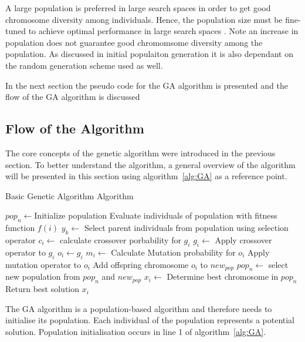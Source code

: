 A large population is preferred in large search spaces in order to get good chromosome diversity among individuals. Hence, the population size must be fine-tuned to achieve optimal performance in large search spaces \cite{AdaptiveSAGA,CompuIntelligenceIntro}. Note an increase in population does not guarantee good chromomsome diversity among the population. As discussed in initial populaiton generation it is also dependant on the random generation scheme used as well. 


In the next section the pseudo code for the \gls{GA} algorithm is presented and the flow of the \gls{GA} algorithm is discussed
\subsection{Flow of the Algorithm}
The core concepts of the genetic algorithm were introduced in the previous section. To better understand the algorithm, a general overview of the algorithm will be presented in this section using algorithm~\ref{alg:GA} as a reference point.
\begin{algorithm}[H]
\caption{Basic Genetic Algorithm Algorithm\cite{FamilyGA,AdaptiveSAGA,DistributedHierarchicalGA,SelfAdaptiveGA}}
\label{alg:GA}
	\begin{algorithmic}[1]
		\State $pop_n\leftarrow$Initialize population
		\State Evaluate individuals of population with fitness function $f(i)$
		\State $y_k \leftarrow$ Select parent individuals from population using selection operator
		\Repeat
				\State $c_i \leftarrow$ calculate crossover porbability for $g_i$
					\State $g_i \leftarrow$ Apply crossover operator to $g_i$
				\EndIf
				\State $o_i \leftarrow g_i$
				\State $m_i\leftarrow$ Calculate Mutation probability for $o_i$
					\State Apply mutation operator to $o_i$
				\EndIf
				\State Add offspring chromosome $o_i$ to $new_{pop}$
			\EndFor
		\State $pop_n \leftarrow$ select new population from $pop_n$ and $new_{pop}$
		\EndWhile
		\State $x_i \leftarrow$ Determine best chromosome in $pop_n$
		\State Return best solution $x_i$
	\end{algorithmic}
\end{algorithm}
The \gls{GA} algorithm is a population-based algorithm and therefore needs to initialise its population. Each individual of the population represents a potential solution. Population initialisation occurs in line 1 of algorithm~\ref{alg:GA}. 

